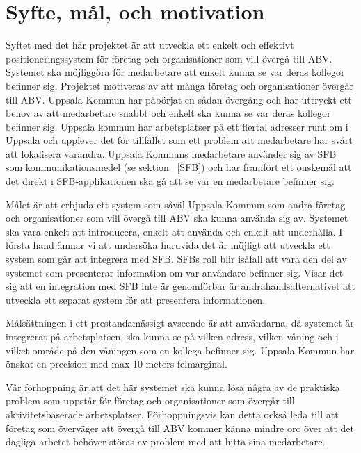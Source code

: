\documentclass[a4paper,12pt]{article}
\begin{document}


 \section{Syfte, mål, och motivation}\label{syfte_mal_mot}
 Syftet med det här projektet är att utveckla ett enkelt och effektivt positioneringssystem för företag och organisationer som vill övergå till ABV. Systemet ska möjliggöra för medarbetare att enkelt kunna se var deras kollegor befinner sig. Projektet motiveras av att många företag och organisationer övergår till ABV. Uppsala Kommun har påbörjat en sådan övergång och har uttryckt ett behov av att medarbetare snabbt och enkelt ska kunna se var deras kollegor befinner sig. Uppsala kommun har arbetsplatser på ett flertal adresser runt om i Uppsala och upplever det för tillfället som ett problem att medarbetare har svårt att lokalisera varandra.
 Uppsala Kommuns medarbetare använder sig av SFB som kommunikationsmedel (se sektion ~\ref{SFB}) och har framfört ett önskemål att det direkt i SFB-applikationen ska gå att se var en medarbetare befinner sig.

 Målet är att erbjuda ett system som såväl Uppsala Kommun som andra företag och organisationer som vill övergå till ABV ska kunna använda sig av. Systemet ska vara enkelt att introducera, enkelt att använda och enkelt att underhålla.
 I första hand ämnar vi att undersöka huruvida det är möjligt att utveckla ett system som går att integrera med SFB. SFBs roll blir isåfall att vara den del av systemet som presenterar information om var användare befinner sig. Visar det sig att en integration med SFB inte är genomförbar är andrahandsalternativet att utveckla ett separat system för att presentera informationen.

 Målsättningen i ett prestandamässigt avseende är att användarna, då systemet är integrerat på arbetsplatsen, ska kunna se på vilken adress, vilken våning och i vilket område på den våningen som en kollega befinner sig. Uppsala Kommun har önskat en precision med max 10 meters felmarginal.

 Vår förhoppning är att det här systemet ska kunna lösa några av de praktiska problem som uppstår för företag och organisationer som övergår till aktivitetsbaserade arbetsplatser. Förhoppningsvis kan detta också leda till att företag som överväger att övergå till ABV kommer känna mindre oro över att det dagliga arbetet behöver störas av problem med att hitta sina medarbetare.
\end{document}
